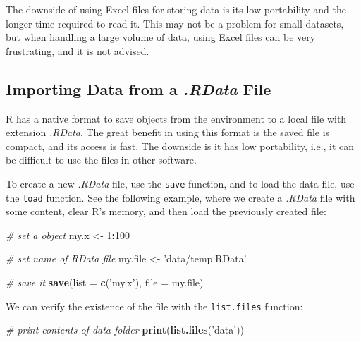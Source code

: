 \documentclass[11pt,]{book}
\newenvironment{Shaded}{\begin{snugshade}}{\end{snugshade}}
\newcommand{\KeywordTok}[1]{\textcolor[rgb]{0.27,0.27,0.27}{\textbf{#1}}}
\newcommand{\DataTypeTok}[1]{\textcolor[rgb]{0.27,0.27,0.27}{#1}}
\newcommand{\DecValTok}[1]{\textcolor[rgb]{0.06,0.06,0.06}{#1}}
\newcommand{\StringTok}[1]{\textcolor[rgb]{0.5,0.5,0.5}{#1}}
\newcommand{\CommentTok}[1]{\textcolor[rgb]{0.56,0.35,0.01}{\textit{#1}}}
\newcommand{\OperatorTok}[1]{\textcolor[rgb]{0.81,0.36,0.00}{\textbf{#1}}}
\newcommand{\NormalTok}[1]{#1}
\begin{document}
The downside of using Excel files for storing data is its low
portability and the longer time required to read it. This may not be a
problem for small datasets, but when handling a large volume of data,
using Excel files can be very frustrating, and it is not advised.

\subsection{\texorpdfstring{Importing Data from a \emph{.RData}
File}{Importing Data from a .RData File}}\label{importing-data-from-a-.rdata-file}

R has a native format to save objects from the environment to a local
file with extension \emph{.RData}. The great benefit in using this
format is the saved file is compact, and its access is fast. The
downside is it has low portability, i.e., it can be difficult to use the
files in other software. 

To create a new \emph{.RData} file, use the \texttt{save} function, and
to load the data file, use the \texttt{load} function. See the following
example, where we create a \emph{.RData} file with some content, clear
R's memory, and then load the previously created file: 

\begin{Shaded}
\begin{Highlighting}[]
\CommentTok{# set a object}
\NormalTok{my.x <-}\StringTok{ }\DecValTok{1}\OperatorTok{:}\DecValTok{100}

\CommentTok{# set name of RData file}
\NormalTok{my.file <-}\StringTok{ 'data/temp.RData'}

\CommentTok{# save it}
\KeywordTok{save}\NormalTok{(}\DataTypeTok{list =} \KeywordTok{c}\NormalTok{(}\StringTok{'my.x'}\NormalTok{), }\DataTypeTok{file =}\NormalTok{ my.file)}
\end{Highlighting}
\end{Shaded}

We can verify the existence of the file with the \texttt{list.files}
function: 

\begin{Shaded}
\begin{Highlighting}[]
\CommentTok{# print contents of data folder}
\KeywordTok{print}\NormalTok{(}\KeywordTok{list.files}\NormalTok{(}\StringTok{'data'}\NormalTok{))}
\end{Highlighting}
\end{Shaded}
\end{document}
